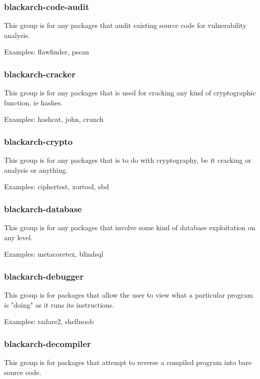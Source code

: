 \documentclass[a4paper, oneside, 11pt]{book}
\begin{document}
\subsubsection{blackarch-code-audit}

This group is for any packages that audit existing source code for vulnerability analysis.

Examples: flawfinder, pscan

\subsubsection{blackarch-cracker}

This group is for any packages that is used for cracking any kind of cryptographic function, ie hashes.

Examples: hashcat, john, crunch

\subsubsection{blackarch-crypto}

This group is for any packages that is to do with cryptography, be it cracking or analysis or anything.

Examples: ciphertest, xortool, sbd

\subsubsection{blackarch-database}

This group is for any packages that involve some kind of database exploitation on any level.

Examples: metacoretex, blindsql

\subsubsection{blackarch-debugger}

This group is for packages that allow the user to view what a particular program is "doing" as it runs its instructions.

Examples: radare2, shellnoob

\subsubsection{blackarch-decompiler}

This group is for packages that attempt to reverse a compiled program into bare source code.
\end{document}
